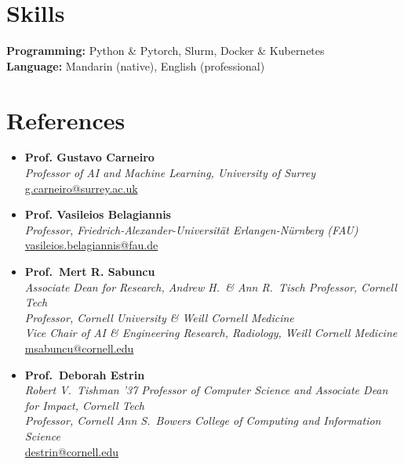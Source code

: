 \documentclass[letterpaper,11pt]{article}
\newcommand{\resumePubheading}[3]{
  \vspace{-2pt} \item\small{
    {\textbf{#1} \vspace{-2pt}}\\
    {\textit{\small#2}}\\ 
    \underline{\small#3}
  }
}
\newcommand{\resumeSubHeadingListStart}{\begin{itemize}[leftmargin=0.15in, label={}]}
\newcommand{\resumeSubHeadingListEnd}{\end{itemize}}
\begin{document}
  \section{Skills}
  \vspace{2pt}
  \resumeSubHeadingListStart
    \small{\item{
        \textbf{Programming: }{Python \& Pytorch, Slurm, Docker \& Kubernetes} \\ \vspace{3pt}
        \textbf{Language: }{Mandarin (native), English (professional)}
        
    }}
  \resumeSubHeadingListEnd

  \section*{References}
  \vspace*{2pt}
  \resumeSubHeadingListStart
  \resumePubheading{Prof. Gustavo Carneiro}{Professor of AI and Machine Learning, University of Surrey}{g.carneiro@surrey.ac.uk}
  \resumePubheading{Prof. Vasileios Belagiannis}{Professor, Friedrich-Alexander-Universität Erlangen-Nürnberg (FAU)}{vasileios.belagiannis@fau.de}
  \resumePubheading{Prof.\ Mert R. Sabuncu}{Associate Dean for Research, Andrew H.\ \& Ann R.\ Tisch Professor, Cornell Tech\\
    Professor, Cornell University \& Weill Cornell Medicine\\
    Vice Chair of AI \& Engineering Research, Radiology, Weill Cornell Medicine}{msabuncu@cornell.edu}
  \resumePubheading{Prof.\ Deborah Estrin}{Robert V.\ Tishman '37 Professor of Computer Science and Associate Dean for Impact, Cornell Tech\\
    Professor, Cornell Ann S.\ Bowers College of Computing and Information Science}{destrin@cornell.edu}
\resumeSubHeadingListEnd


\end{document}
